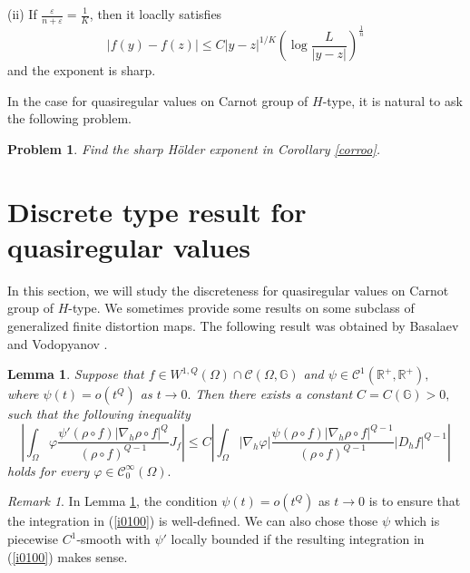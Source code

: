 \documentclass[11pt,twoside]{article}
\newtheorem{lem}[thm]{Lemma}
\newtheorem{prob}[thm]{Problem}
\theoremstyle{definition}
\theoremstyle{remark}
\newtheorem*{rem}{Remark}
\newcommand{\abs}[1]{\left|#1\right|}
\begin{document}
    
    (ii)  If $\frac{\varepsilon}{n+\varepsilon}=\frac{1}{K}$, then it loaclly satisfies
$$\vert f(y)-f(z)\vert\leq C\vert y-z\vert^{1/K}\left(\log\frac{L}{\vert y-z\vert}\right)^{\frac{1}{n}}$$
and the  exponent  is sharp. 

In the case for quasiregular values on Carnot group of $H$-type, it is natural to ask the following problem.

 \begin{prob}
 Find the sharp H\"{o}lder exponent in Corollary \ref{corroo}.
 \end{prob}












\section{Discrete type result for quasiregular values}\label{sec3333}
In this section, we will study  the discreteness for quasiregular values on Carnot group of $H$-type. We sometimes provide some results on some subclass of generalized finite distortion maps.  The following result was obtained by  Basalaev and  Vodopyanov \cite[Lemma 2.4]{BV23}.
\begin{lem}{\rm\cite[Lemma 2.4]{BV23}}\label{l00}
Suppose that $f\in W^{1,Q}(\Omega)\cap \mathcal{C}(\Omega,\mathbb{G})$ and $\psi\in \mathcal{C}^{1}(\mathbb{R}^{+},\mathbb{R}^{+}),$ where $\psi(t)=o(t^{Q})$ as $t\rightarrow0.$ Then there exists a constant
$C=C(\mathbb{G})>0,$ such that the following inequality 
\begin{equation}\label{i0100}
\abs{\int_{\Omega}\varphi\frac{\psi'(\rho\circ f)\vert\nabla_{h}\rho\circ f\vert^{Q}}{(\rho\circ f)^{Q-1}}J_{f}}\leq C\abs{\int_{\Omega}\vert\nabla_{h}\varphi\vert\frac{\psi(\rho\circ f)\vert\nabla_{h}\rho\circ f\vert^{Q-1}}{(\rho\circ f)^{Q-1}}\vert D_{h}f\vert^{Q-1} }
\end{equation}
holds for every $\varphi\in \mathcal{C}_{0}^{\infty}(\Omega).$
\end{lem}
\begin{rem}
In Lemma \ref{l00}, the condition  $\psi(t)=o(t^{Q})$ as $t\rightarrow0$ is to ensure that the integration in (\ref{i0100}) is well-defined.  We can also chose those $\psi$ which is piecewise $C^{1}$-smooth with $\psi'$ locally bounded if the resulting integration in (\ref{i0100}) makes sense.
\end{rem}
\end{document}
